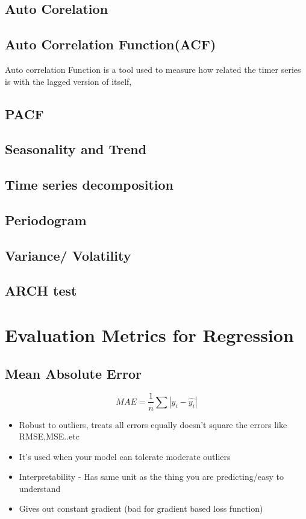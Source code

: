 \documentclass[12pt]{extarticle}
\begin{document}
\subsection*{Auto Corelation}
\subsection{Auto Correlation Function(ACF)}
Auto correlation Function is a tool used to measure how related the timer series is 
with the lagged version of itself,



\subsection{PACF}
\subsection*{Seasonality and Trend}
\subsection{Time series decomposition}
\subsection{Periodogram}
\subsection*{Variance/ Volatility}
\subsection{ARCH test}




\section{Evaluation Metrics for Regression}

\subsection{Mean Absolute Error}  

$$MAE = \frac{1}{n}\sum{|y_i - \hat{y_i}|}$$ 
\begin{itemize}
    \item Robust to outliers, treats all errors equally doesn’t square the errors like RMSE,MSE..etc 
    \item It’s used when your model can tolerate moderate outliers  
    \item Interpretability - Has same unit as the thing you are predicting/easy to understand 
    \item Gives out constant gradient (bad for gradient based loss function) 
\end{itemize}
 
\end{document}
